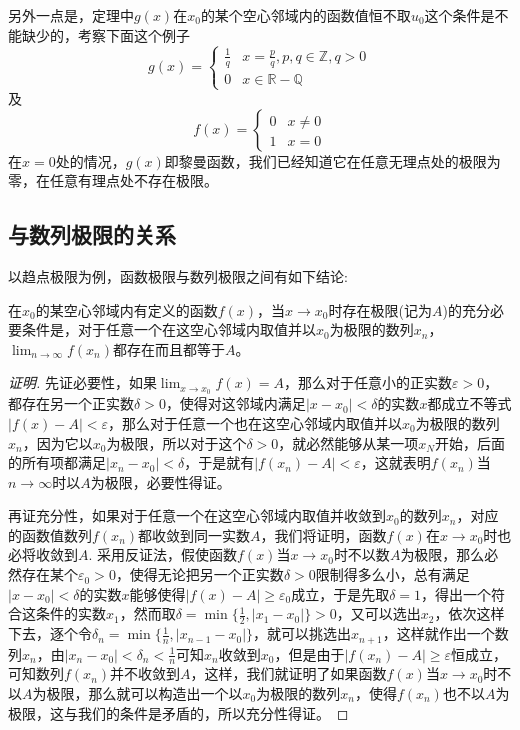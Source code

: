 另外一点是，定理中$g(x)$在$x_0$的某个空心邻域内的函数值恒不取$u_0$这个条件是不能缺少的，考察下面这个例子
\[ g(x)=
  \begin{cases}
    \frac{1}{q} & x = \frac{p}{q}, p,q \in \mathbb{Z}, q>0 \\
    0 & x \in \mathbb{R}-\mathbb{Q}
  \end{cases}
\]
及
\[ f(x) =
  \begin{cases}
    0 & x \neq 0 \\
    1 & x = 0
  \end{cases}
\]
在$x=0$处的情况，$g(x)$即黎曼函数，我们已经知道它在任意无理点处的极限为零，在任意有理点处不存在极限。

\subsection{与数列极限的关系}
\label{sec:relation-between-limit-of-function-and-number-sequence}

以趋点极限为例，函数极限与数列极限之间有如下结论:
\begin{theorem}[函数极限与数列极限的关系]
  在$x_0$的某空心邻域内有定义的函数$f(x)$，当$x \to x_0$时存在极限(记为$A$)的充分必要条件是，对于任意一个在这空心邻域内取值并以$x_0$为极限的数列$x_n$，$\lim_{n \to \infty}f(x_n)$都存在而且都等于$A$。
\end{theorem}

\begin{proof}[证明]
  先证必要性，如果$\lim_{x \to x_0} f(x) = A$，那么对于任意小的正实数$\varepsilon > 0$，都存在另一个正实数$\delta > 0$，使得对这邻域内满足$|x-x_0|<\delta$的实数$x$都成立不等式$|f(x)-A|<\varepsilon$，那么对于任意一个也在这空心邻域内取值并以$x_0$为极限的数列$x_n$，因为它以$x_0$为极限，所以对于这个$\delta>0$，就必然能够从某一项$x_N$开始，后面的所有项都满足$|x_n-x_0|<\delta$，于是就有$|f(x_n)-A|<\varepsilon$，这就表明$f(x_n)$当$n \to \infty$时以$A$为极限，必要性得证。

  再证充分性，如果对于任意一个在这空心邻域内取值并收敛到$x_0$的数列$x_n$，对应的函数值数列$f(x_n)$都收敛到同一实数$A$，我们将证明，函数$f(x)$在$x \to x_0$时也必将收敛到$A$. 采用反证法，假使函数$f(x)$当$x \to x_0$时不以数$A$为极限，那么必然存在某个$\varepsilon_0>0$，使得无论把另一个正实数$\delta>0$限制得多么小，总有满足$|x-x_0|<\delta$的实数$x$能够使得$|f(x)-A| \geqslant \varepsilon_0$成立，于是先取$\delta=1$，得出一个符合这条件的实数$x_1$，然而取$\delta=\min\{\frac{1}{2}, |x_1-x_0|\}>0$，又可以选出$x_2$，依次这样下去，逐个令$\delta_n=\min\{\frac{1}{n}, |x_{n-1}-x_0|\}$，就可以挑选出$x_{n+1}$，这样就作出一个数列$x_n$，由$|x_n-x_0|<\delta_n<\frac{1}{n}$可知$x_n$收敛到$x_0$，但是由于$|f(x_n)-A| \geqslant \varepsilon$恒成立，可知数列$f(x_n)$并不收敛到$A$，这样，我们就证明了如果函数$f(x)$当$x \to x_0$时不以$A$为极限，那么就可以构造出一个以$x_0$为极限的数列$x_n$，使得$f(x_n)$也不以$A$为极限，这与我们的条件是矛盾的，所以充分性得证。
\end{proof}

